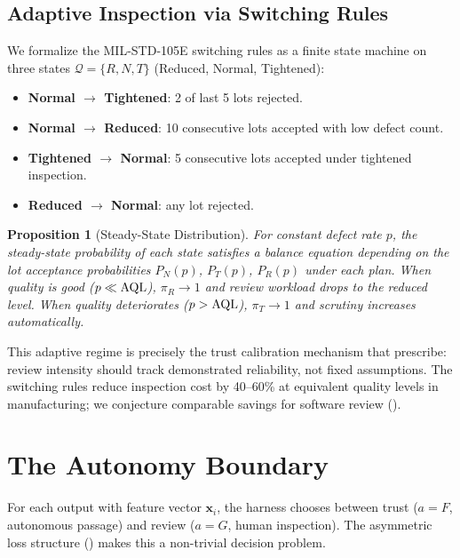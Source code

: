 \documentclass[11pt, a4paper, copyright]{googledeepmind}
\newtheorem{proposition}{Proposition}[section]
\begin{document}
\subsection{Adaptive Inspection via Switching Rules}

We formalize the MIL-STD-105E switching rules \citep{milstd105e} as a finite state machine on three states $\mathcal{Q} = \{R, N, T\}$ (Reduced, Normal, Tightened):

\begin{itemize}[leftmargin=*]
\item \textbf{Normal $\to$ Tightened}: 2 of last 5 lots rejected.
\item \textbf{Normal $\to$ Reduced}: 10 consecutive lots accepted with low defect count.
\item \textbf{Tightened $\to$ Normal}: 5 consecutive lots accepted under tightened inspection.
\item \textbf{Reduced $\to$ Normal}: any lot rejected.
\end{itemize}

\begin{proposition}[Steady-State Distribution]
\label{prop:steady-state}
For constant defect rate $p$, the steady-state probability of each state satisfies a balance equation depending on the lot acceptance probabilities $P_N(p)$, $P_T(p)$, $P_R(p)$ under each plan. When quality is good ($p \ll \textup{AQL}$), $\pi_R \to 1$ and review workload drops to the reduced level. When quality deteriorates ($p > \textup{AQL}$), $\pi_T \to 1$ and scrutiny increases automatically.
\end{proposition}

This adaptive regime is precisely the trust calibration mechanism that \citet{lee2004trust} prescribe: review intensity should track demonstrated reliability, not fixed assumptions. The switching rules reduce inspection cost by 40--60\% at equivalent quality levels in manufacturing; we conjecture comparable savings for software review ().

\section{The Autonomy Boundary}
\label{sec:autonomy}

For each output with feature vector $\mathbf{x}_i$, the harness chooses between trust ($a = F$, autonomous passage) and review ($a = G$, human inspection). The asymmetric loss structure () makes this a non-trivial decision problem.
\end{document}
